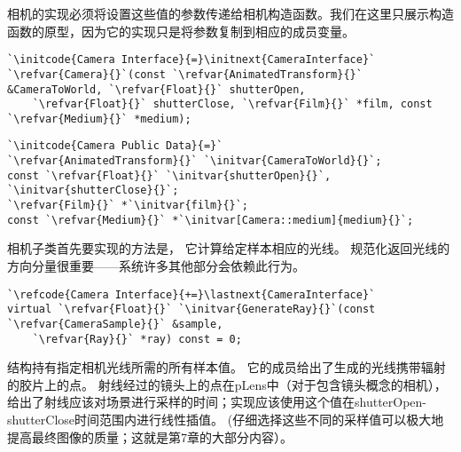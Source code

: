 相机的实现必须将设置这些值的参数传递给相机构造函数。我们在这里只展示构造函数的原型，因为它的实现只是将参数复制到相应的成员变量。
\begin{lstlisting}
`\initcode{Camera Interface}{=}\initnext{CameraInterface}`
`\refvar{Camera}{}`(const `\refvar{AnimatedTransform}{}` &CameraToWorld, `\refvar{Float}{}` shutterOpen,
    `\refvar{Float}{}` shutterClose, `\refvar{Film}{}` *film, const `\refvar{Medium}{}` *medium);
\end{lstlisting}
\begin{lstlisting}
`\initcode{Camera Public Data}{=}`
`\refvar{AnimatedTransform}{}` `\initvar{CameraToWorld}{}`;
const `\refvar{Float}{}` `\initvar{shutterOpen}{}`, `\initvar{shutterClose}{}`;
`\refvar{Film}{}` *`\initvar{film}{}`;
const `\refvar{Medium}{}` *`\initvar[Camera::medium]{medium}{}`;
\end{lstlisting}

相机子类首先要实现的方法是，
它计算给定样本相应的光线。
规范化返回光线的方向分量很重要——系统许多其他部分会依赖此行为。

\begin{lstlisting}
`\refcode{Camera Interface}{+=}\lastnext{CameraInterface}`
virtual `\refvar{Float}{}` `\initvar{GenerateRay}{}`(const `\refvar{CameraSample}{}` &sample,
    `\refvar{Ray}{}` *ray) const = 0;
\end{lstlisting}

结构持有指定相机光线所需的所有样本值。
它的成员给出了生成的光线携带辐射的胶片上的点。
射线经过的镜头上的点在pLens中（对于包含镜头概念的相机），给出了射线应该对场景进行采样的时间；实现应该使用这个值在shutterOpen-shutterClose时间范围内进行线性插值。
(仔细选择这些不同的采样值可以极大地提高最终图像的质量；这就是第7章的大部分内容）。

